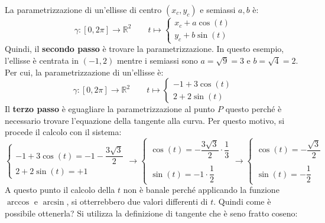 \documentclass[a4paper]{article}
\begin{document}
	La parametrizzazione di un'ellisse di centro $\left(x_{c}, y_{c}\right)$ e semiassi $a,b$ è:
	\begin{equation*}
		\gamma:\left[0,2\pi\right] \rightarrow \mathbb{R}^{2} \hspace{2em}
		t 
		\mapsto 
		\begin{cases}
			x_{c} + a \cos\left(t\right) \\
			y_{c} + b \sin\left(t\right)
		\end{cases}
	\end{equation*}
	Quindi, il \textbf{secondo passo} è trovare la parametrizzazione. In questo esempio, l'ellisse è centrata in $\left(-1, 2\right)$ mentre i semiassi sono $a = \sqrt{9} = 3$ e $b = \sqrt{4} = 2$. Per cui, la parametrizzazione di un'ellisse è:
	\begin{equation*}
		\gamma:\left[0,2\pi\right] \rightarrow \mathbb{R}^{2} \hspace{2em}
		t 
		\mapsto 
		\begin{cases}
			-1 + 3 \cos\left(t\right) \\
			2  + 2 \sin\left(t\right)
		\end{cases}
	\end{equation*}
	Il \textbf{terzo passo} è eguagliare la parametrizzazione al punto $P$ questo perché è necessario trovare l'equazione della tangente alla curva. Per questo motivo, si procede il calcolo con il sistema:
	\begin{equation*}
		\begin{cases}
			-1 + 3 \cos\left(t\right) = -1 - \dfrac{3\sqrt{3}}{2} \\
			2  + 2 \sin\left(t\right) = +1
		\end{cases}
		\rightarrow
		\begin{cases}
			\cos\left(t\right) = - \dfrac{3\sqrt{3}}{2} \cdot \dfrac{1}{3} \\
			\\
			\sin\left(t\right) = -1 \cdot \dfrac{1}{2}
		\end{cases}
		\rightarrow
		\begin{cases}
			\cos\left(t\right) = - \dfrac{\sqrt{3}}{2} \\
			\\
			\sin\left(t\right) = - \dfrac{1}{2}
		\end{cases}
	\end{equation*}
	A questo punto il calcolo della $t$ non è banale perché applicando la funzione $\arccos$ e $\arcsin$, si otterrebbero due valori differenti di $t$. Quindi come è possibile ottenerla? Si utilizza la definizione di tangente che è seno fratto coseno:
\end{document}

